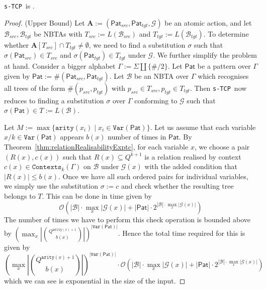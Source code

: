 \documentclass[12pt, a4paper]{article}
\newcommand{\typecheckingProblem}{\texttt{s-TCP}}
\newcommand{\bigo}{\mathcal{O}}
\newcommand{\arity}{\texttt{arity}}
\newcommand{\Alphabet}{\ensuremath{\Sigma}}
\newcommand{\Variables}{\texttt{Var}}
\newcommand{\Contexts}[2]{\ensuremath{\texttt{Contexts}_{#2}\left(#1\right)}}
\newcommand{\substitution}{\ensuremath{\sigma}}
\newcommand{\pattern}{\mathsf{Pat}}
\newcommand{\action}{\ensuremath{\mathbf{A}}}
\newcommand{\automatonB}{\ensuremath{\mathcal{B}}}
\newcommand{\guardFunction}{\ensuremath{\mathcal{G}}}
\newcommand{\guard}[1]{\ensuremath{\guardFunction(#1)}}
\newcommand{\stLang}{T}
\newcommand{\src}{\mathit{src}}
\newcommand{\sourcePattern}{\pattern_\src}
\newcommand{\sourceLang}{\ensuremath{\stLang_{\src}}}
\newcommand{\sourceAutomatonB}{\ensuremath{\automatonB_{\src}}}
\newcommand{\tgt}{\mathit{tgt}}
\newcommand{\targetPattern}{\pattern_\tgt}
\newcommand{\targetLang}{\ensuremath{\stLang_{\tgt}}}
\newcommand{\targetAutomatonB}{\ensuremath{\automatonB_{\tgt}}}
\begin{document}
\begin{theorem}\label{thm:typecheckingProblem}
    \typecheckingProblem\ is \exptc.
\end{theorem}

\begin{proof}
    (Upper Bound) Let $\action := (\sourcePattern, \targetPattern, \guardFunction)$ be an atomic action, and let $\sourceAutomatonB, \targetAutomatonB$ be NBTAs with  
    $\sourceLang := L(\sourceAutomatonB)$ and $\targetLang := L(\targetAutomatonB)$.
    To determine whether $\action[\sourceLang] \cap \targetLang \neq \emptyset$, we need to find a substitution $\substitution$ such that $\substitution(\sourcePattern) \in \sourceLang$ and $\substitution(\targetPattern) \in \targetLang$ under $\guardFunction$. We further simplify the problem at hand. Consider a bigger alphabet $\Gamma := \Alphabet \coprod \{\#/2\}$. Let $\pattern$ be a pattern over $\Gamma$ given by $\pattern := \#(\sourcePattern, \targetPattern)$. Let $\automatonB$ be an NBTA over $\Gamma$ which recognises all trees of the form $\#(p_{\mathit{src}}, p_{\mathit{tgt}})$ with $p_{\mathit{src}} \in \sourceLang, p_{\mathit{tgt}} \in \targetLang$. Then \typecheckingProblem\ now reduces to finding a substitution $\substitution$ over $\Gamma$ conforming to $\guardFunction$ such that $\substitution(\pattern) \in \stLang := L(\automatonB)$.

    Let $M := \max \{\arity(x_i) \mid x_i \in \Variables(\pattern)\}$. Let us assume that each variable $x/k \in \Variables(\pattern)$ appears $b(x)$ number of times in $\pattern$. By Theorem~\ref{thm:relationRealisabilityExptc}, for each variable $x$, we choose a pair $(R(x), c(x))$ such that $R(x) \subseteq Q^{k+1}$ is a relation realised by context $c(x) \in \Contexts{\Gamma}{k}$ on $\automatonB$ under $\guard{x}$ with the added condition that $|R(x)| \leq b(x)$. Once we have all such ordered pairs for individual variables, we simply use the substitution $\substitution := c$ and check whether the resulting tree belongs to $T$. This can be done in time given by
    \[ \bigo(|\automatonB| \cdot \max_x|\guard{x}| + |\pattern| \cdot 2^{|\automatonB| \cdot \max_x|\guard{x}|}) \]
    The number of times we have to perform this check operation is bounded above by $\left(\max_x\left| \binom{Q^{\arity(x)+1}}{b(x)} \right|\right)^{|\Variables(\pattern)|}$. Hence the total time required for this is given by
    \[ \left(\max_x\left| \binom{Q^{\arity(x)+1}}{b(x)} \right|\right)^{|\Variables(\pattern)|} \cdot \bigo(|\automatonB| \cdot \max_x|\guard{x}| + |\pattern| \cdot 2^{|\automatonB| \cdot \max_x|\guard{x}|}) \]
    which we can see is exponential in the size of the input.


\end{proof}
\end{document}
